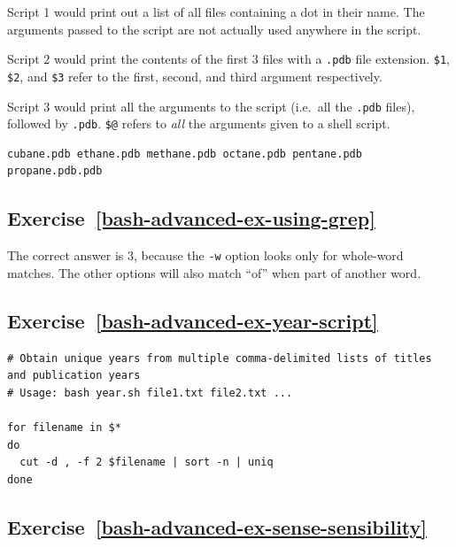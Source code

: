 \documentclass[
]{krantz}
\begin{document}
Script 1 would print out a list of all files containing a dot in their name.
The arguments passed to the script are not actually used anywhere in the script.

Script 2 would print the contents of the first 3 files with a \texttt{.pdb} file extension.
\texttt{\$1}, \texttt{\$2}, and \texttt{\$3} refer to the first, second, and third argument respectively.

Script 3 would print all the arguments to the script (i.e.~all the \texttt{.pdb} files),
followed by \texttt{.pdb}.
\texttt{\$@} refers to \emph{all} the arguments given to a shell script.

\begin{verbatim}
cubane.pdb ethane.pdb methane.pdb octane.pdb pentane.pdb propane.pdb.pdb
\end{verbatim}

\hypertarget{exercise-refbash-advanced-ex-using-grep}{%
\subsection*{Exercise~\ref{bash-advanced-ex-using-grep}}\label{exercise-refbash-advanced-ex-using-grep}}


The correct answer is 3, because the \texttt{-w} option looks only for whole-word matches.
The other options will also match ``of'' when part of another word.

\hypertarget{exercise-refbash-advanced-ex-year-script}{%
\subsection*{Exercise~\ref{bash-advanced-ex-year-script}}\label{exercise-refbash-advanced-ex-year-script}}


\begin{verbatim}
# Obtain unique years from multiple comma-delimited lists of titles and publication years
# Usage: bash year.sh file1.txt file2.txt ...

for filename in $*
do
  cut -d , -f 2 $filename | sort -n | uniq
done
\end{verbatim}

\hypertarget{exercise-refbash-advanced-ex-sense-sensibility}{%
\subsection*{Exercise~\ref{bash-advanced-ex-sense-sensibility}}\label{exercise-refbash-advanced-ex-sense-sensibility}}
\end{document}
